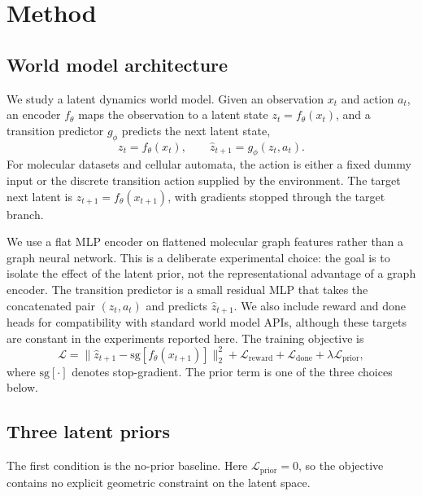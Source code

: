 \section{Method}\label{sec:method}

\subsection{World model architecture}\label{sec:architecture}

We study a latent dynamics world model. Given an observation \(x_t\) and action \(a_t\), an encoder \(f_\theta\) maps the observation to a latent state \(z_t=f_\theta(x_t)\), and a transition predictor \(g_\phi\) predicts the next latent state,
\begin{equation}
z_t = f_\theta(x_t), \qquad \hat{z}_{t+1} = g_\phi(z_t,a_t).
\end{equation}
For molecular datasets and cellular automata, the action is either a fixed dummy input or the discrete transition action supplied by the environment. The target next latent is \(z_{t+1}=f_\theta(x_{t+1})\), with gradients stopped through the target branch.

We use a flat MLP encoder on flattened molecular graph features rather than a graph neural network. This is a deliberate experimental choice: the goal is to isolate the effect of the latent prior, not the representational advantage of a graph encoder. The transition predictor is a small residual MLP that takes the concatenated pair \((z_t,a_t)\) and predicts \(\hat{z}_{t+1}\). We also include reward and done heads for compatibility with standard world model APIs, although these targets are constant in the experiments reported here. The training objective is
\begin{equation}
\mathcal{L}
= \|\hat{z}_{t+1} - \mathrm{sg}[f_\theta(x_{t+1})]\|_2^2
+ \mathcal{L}_{\mathrm{reward}}
+ \mathcal{L}_{\mathrm{done}}
+ \lambda \mathcal{L}_{\mathrm{prior}},
\end{equation}
where \(\mathrm{sg}[\cdot]\) denotes stop-gradient. The prior term is one of the three choices below.

\subsection{Three latent priors}\label{sec:priors}

The first condition is the no-prior baseline. Here \(\mathcal{L}_{\mathrm{prior}}=0\), so the objective contains no explicit geometric constraint on the latent space.

